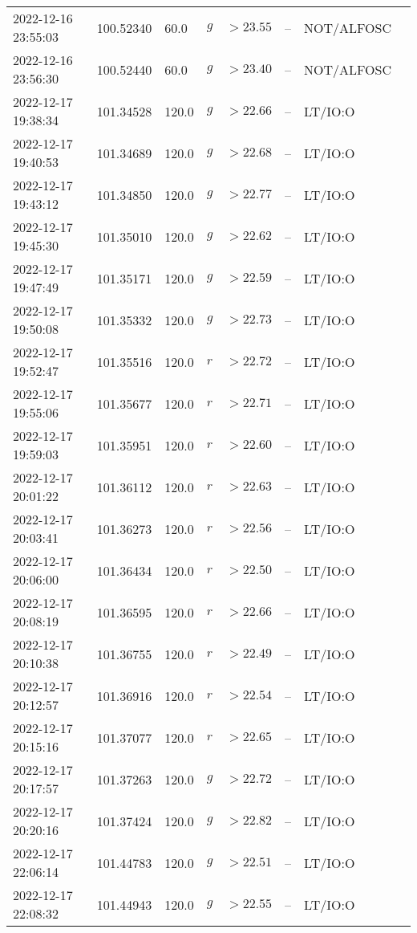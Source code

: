 \documentclass{nature_plusfigure}
\begin{document}
\begin{supplement}
\begin{center}
\begin{longtable}{llllllll}
2022-12-16 23:55:03 & 100.52340 & 60.0 & $g$ & $>23.55$ & -- & NOT/ALFOSC &  \\ 
2022-12-16 23:56:30 & 100.52440 & 60.0 & $g$ & $>23.40$ & -- & NOT/ALFOSC &  \\ 
2022-12-17 19:38:34 & 101.34528 & 120.0 & $g$ & $>22.66$ & -- & LT/IO:O &  \\ 
2022-12-17 19:40:53 & 101.34689 & 120.0 & $g$ & $>22.68$ & -- & LT/IO:O &  \\ 
2022-12-17 19:43:12 & 101.34850 & 120.0 & $g$ & $>22.77$ & -- & LT/IO:O &  \\ 
2022-12-17 19:45:30 & 101.35010 & 120.0 & $g$ & $>22.62$ & -- & LT/IO:O &  \\ 
2022-12-17 19:47:49 & 101.35171 & 120.0 & $g$ & $>22.59$ & -- & LT/IO:O &  \\ 
2022-12-17 19:50:08 & 101.35332 & 120.0 & $g$ & $>22.73$ & -- & LT/IO:O &  \\ 
2022-12-17 19:52:47 & 101.35516 & 120.0 & $r$ & $>22.72$ & -- & LT/IO:O &  \\ 
2022-12-17 19:55:06 & 101.35677 & 120.0 & $r$ & $>22.71$ & -- & LT/IO:O &  \\ 
2022-12-17 19:59:03 & 101.35951 & 120.0 & $r$ & $>22.60$ & -- & LT/IO:O &  \\ 
2022-12-17 20:01:22 & 101.36112 & 120.0 & $r$ & $>22.63$ & -- & LT/IO:O &  \\ 
2022-12-17 20:03:41 & 101.36273 & 120.0 & $r$ & $>22.56$ & -- & LT/IO:O &  \\ 
2022-12-17 20:06:00 & 101.36434 & 120.0 & $r$ & $>22.50$ & -- & LT/IO:O &  \\ 
2022-12-17 20:08:19 & 101.36595 & 120.0 & $r$ & $>22.66$ & -- & LT/IO:O &  \\ 
2022-12-17 20:10:38 & 101.36755 & 120.0 & $r$ & $>22.49$ & -- & LT/IO:O &  \\ 
2022-12-17 20:12:57 & 101.36916 & 120.0 & $r$ & $>22.54$ & -- & LT/IO:O &  \\ 
2022-12-17 20:15:16 & 101.37077 & 120.0 & $r$ & $>22.65$ & -- & LT/IO:O &  \\ 
2022-12-17 20:17:57 & 101.37263 & 120.0 & $g$ & $>22.72$ & -- & LT/IO:O &  \\ 
2022-12-17 20:20:16 & 101.37424 & 120.0 & $g$ & $>22.82$ & -- & LT/IO:O &  \\ 
2022-12-17 22:06:14 & 101.44783 & 120.0 & $g$ & $>22.51$ & -- & LT/IO:O &  \\ 
2022-12-17 22:08:32 & 101.44943 & 120.0 & $g$ & $>22.55$ & -- & LT/IO:O &  \\ 

\end{longtable}
\end{center}
\end{supplement}
\end{document}
